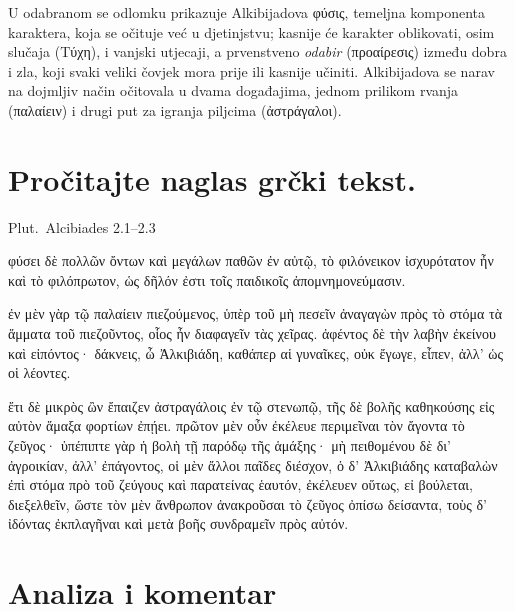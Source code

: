 U odabranom se odlomku prikazuje Alkibijadova \textgreek[variant=ancient]{φύσις,} temeljna komponenta karaktera, koja se očituje već u djetinjstvu; kasnije će karakter oblikovati, osim slučaja \textgreek[variant=ancient]{(Τύχη),} i vanjski utjecaji, a prvenstveno \textit{odabir} \textgreek[variant=ancient]{(προαίρεσις)} između dobra i zla, koji svaki veliki čovjek mora prije ili kasnije učiniti. Alkibijadova se narav na dojmljiv način očitovala u dvama događajima, jednom prilikom rvanja \textgreek[variant=ancient]{(παλαίειν)} i drugi put za igranja piljcima \textgreek[variant=ancient]{(ἀστράγαλοι).}


\section*{Pročitajte naglas grčki tekst.}

Plut.\ Alcibiades 2.1–2.3


\medskip


{\large

\begin{greek}

\noindent φύσει δὲ πολλῶν ὄντων καὶ μεγάλων παθῶν ἐν αὐτῷ, τὸ φιλόνεικον ἰσχυρότατον ἦν καὶ τὸ φιλόπρωτον, ὡς δῆλόν ἐστι τοῖς παιδικοῖς ἀπομνημονεύμασιν.

ἐν μὲν γὰρ τῷ παλαίειν πιεζούμενος, ὑπὲρ τοῦ μὴ πεσεῖν ἀναγαγὼν πρὸς τὸ στόμα τὰ ἅμματα τοῦ πιεζοῦντος, οἷος ἦν διαφαγεῖν τὰς χεῖρας. ἀφέντος δὲ τὴν λαβὴν ἐκείνου καὶ εἰπόντος· δάκνεις, ὦ Ἀλκιβιάδη, καθάπερ αἱ γυναῖκες, οὐκ ἔγωγε, εἶπεν, ἀλλ' ὡς οἱ λέοντες.

ἔτι δὲ μικρὸς ὢν ἔπαιζεν ἀστραγάλοις ἐν τῷ στενωπῷ, τῆς δὲ βολῆς καθηκούσης εἰς αὐτὸν ἅμαξα φορτίων ἐπῄει. πρῶτον μὲν οὖν ἐκέλευε περιμεῖναι τὸν ἄγοντα τὸ ζεῦγος· ὑπέπιπτε γὰρ ἡ βολὴ τῇ παρόδῳ τῆς ἁμάξης· μὴ πειθομένου δὲ δι' ἀγροικίαν, ἀλλ' ἐπάγοντος, οἱ μὲν ἄλλοι παῖδες διέσχον, ὁ δ' Ἀλκιβιάδης καταβαλὼν ἐπὶ στόμα πρὸ τοῦ ζεύγους καὶ παρατείνας ἑαυτόν, ἐκέλευεν οὕτως, εἰ βούλεται, διεξελθεῖν, ὥστε τὸν μὲν ἄνθρωπον ἀνακροῦσαι τὸ ζεῦγος ὀπίσω δείσαντα, τοὺς δ' ἰδόντας ἐκπλαγῆναι καὶ μετὰ βοῆς συνδραμεῖν πρὸς αὐτόν.

\end{greek}

}


\section*{Analiza i komentar}

